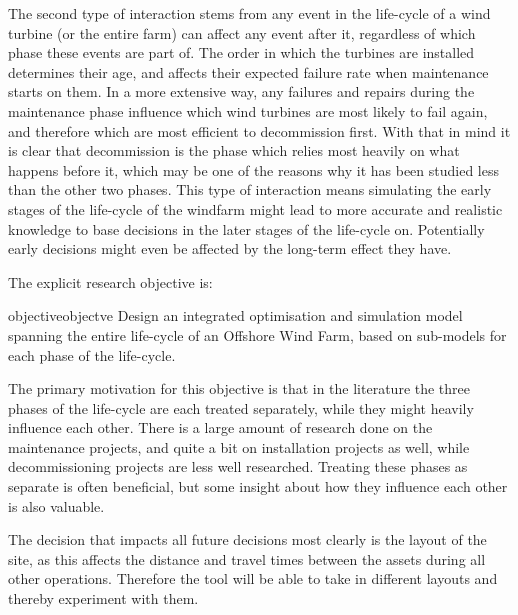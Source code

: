 \documentclass[a4paper,12pt]{article}
\begin{document}
The second type of interaction stems from any event in the life-cycle of a wind turbine (or the entire farm) can affect any event after it, regardless of which phase these events are part of. The order in which the turbines are installed determines their age, and affects their expected failure rate when maintenance starts on them. In a more extensive way, any failures and repairs during the maintenance phase influence which wind turbines are most likely to fail again, and therefore which are most efficient to decommission first. With that in mind it is clear that decommission is the phase which relies most heavily on what happens before it, which may be one of the reasons why it has been studied less than the other two phases. This type of interaction means simulating the early stages of the life-cycle of the windfarm might lead to more accurate and realistic knowledge to base decisions in the later stages of the life-cycle on. Potentially early decisions might even be affected by the long-term effect they have. 

\iffalse

The explicit research objective is: 

\begin{restatable}{objective}{objectve}
\label{objectve}
Design an integrated optimisation and simulation model spanning the entire life-cycle of an Offshore Wind Farm, based on sub-models for each phase of the life-cycle.
\end{restatable}

The primary motivation for this objective is that in the literature the three phases of the life-cycle are each treated separately, while they might heavily influence each other. There is a large amount of research done on the maintenance projects, and quite a bit on installation projects as well, while decommissioning projects are less well researched. Treating these phases as separate is often beneficial, but some insight about how they influence each other is also valuable. 

The decision that impacts all future decisions most clearly is the layout of the site, as this affects the distance and travel times between the assets during all other operations. Therefore the tool will be able to take in different layouts and thereby experiment with them. 
\end{document}
